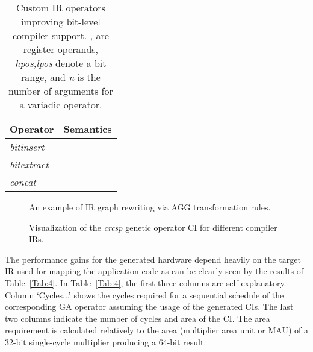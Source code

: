 \documentclass{comjnl}
\begin{document}
\begin{table}
  \renewcommand{\arraystretch}{0.95}
  \caption{Custom IR operators improving bit-level compiler support. ,  are register operands, {\it hpos,lpos} denote a bit range, and {\it n} is the number of arguments for a variadic operator.} 
  \centering
  {\footnotesize
  \begin{tabular}{|l|c|}
    \hline
    \multicolumn{1}{|m{2.0cm}|}{\centering Operator}
    &\multicolumn{1}{m{5.0cm}|}{\centering Semantics}\\
    \hline
    {\it bitinsert} &  \\ 
    {\it bitextract} &  \\ 
    {\it concat} &  \\
    \hline
  \end{tabular}
  }
  \label{Tab:3}
  \vspace{-0.125cm}
\end{table}

\begin{figure}[tb]
  \centering
  \caption{An example of IR graph rewriting via AGG transformation rules.}
  \label{Fig:7}
  \vspace{-0.125cm}
\end{figure}

\begin{figure}[tb]
  \centering
  \caption{Visualization of the {\it crcsp} genetic operator CI for different compiler IRs.}
  \label{Fig:8}
  \vspace{-0.125cm}
\end{figure}

The performance gains for the generated hardware depend heavily on the target IR used for mapping the application code as can be clearly seen by the results of Table~\ref{Tab:4}. In Table~\ref{Tab:4}, the first three columns are self-explanatory. Column `Cycles...' shows the cycles required for a sequential schedule of the corresponding GA operator assuming the usage of the generated CIs. The last two columns indicate the number of cycles and area of the CI. The area requirement is calculated relatively to the area (multiplier area unit or MAU) of a 32-bit single-cycle multiplier producing a 64-bit result.
\end{document}

